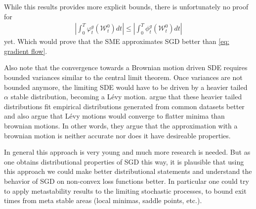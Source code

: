 While this results provides more explicit bounds, there is unfortunately no
proof for
\begin{align*}
	\left| \int_0^T \varphi_t^g(\mathcal{W}^0_t)dt \right|
	\le \left| \int_0^T \phi_t^g(\mathcal{W}^0_t)dt \right|
\end{align*}
yet. Which would prove that the SME approximates SGD better than \ref{eq:
gradient flow}.

Also note that the convergence towards a Brownian motion driven SDE requires
bounded variances similar to the central limit theorem. Once variances are not
bounded anymore, the limiting SDE would have to be driven by a heavier tailed
\(\alpha\) stable distribution, becoming a Lévy motion. \textcite{simsekliTailIndexAnalysisStochastic2019}
argue that these heavier tailed distributions fit empirical distributions
generated from common datasets better and also argue that Lévy motions would
converge to flatter minima than brownian motions. In other words, they argue
that the approximation with a brownian motion is neither accurate nor does it
have desireable properties.

In general this approach is very young and much more research is needed. But as
one obtains distributional properties of SGD this way, it is plausible that using
this approach we could make better distributional statements and understand the
behavior of SGD on non-convex loss functions better. In particular one could try
to apply metastability results
\parencite[e.g.][]{bovierMetastabilityPotentialTheoreticApproach2015} to the
limiting stochastic processes, to bound exit times from meta stable areas (local
minimas, saddle points, etc.).


\endinput
